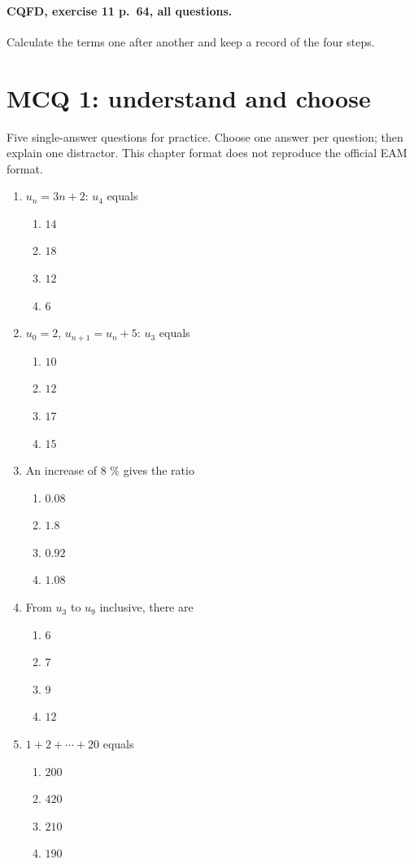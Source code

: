 \paragraph{CQFD, exercise 11 p.~64, all questions.}\label{C01-M2} Calculate the terms one after another and keep a record of the four steps.
\begingroup\small
\clearpage\section*{MCQ 1: understand and choose}\label{C01-Q1}
Five single-answer questions for practice. Choose one answer per question; then explain one distractor. This chapter format does not reproduce the official EAM format.
\begin{enumerate}
\item $u_n=3n+2$: $u_4$ equals
\begin{enumerate}[label=\Alph*.,itemsep=2pt]
\item $14$
\item $18$
\item $12$
\item $6$
\end{enumerate}
\item $u_0=2$, $u_{n+1}=u_n+5$: $u_3$ equals
\begin{enumerate}[label=\Alph*.,itemsep=2pt]
\item $10$
\item $12$
\item $17$
\item $15$
\end{enumerate}
\item An increase of 8 \% gives the ratio
\begin{enumerate}[label=\Alph*.,itemsep=2pt]
\item $0.08$
\item $1.8$
\item $0.92$
\item $1.08$
\end{enumerate}
\item From $u_3$ to $u_9$ inclusive, there are
\begin{enumerate}[label=\Alph*.,itemsep=2pt]
\item $6$
\item $7$
\item $9$
\item $12$
\end{enumerate}
\item $1+2+\cdots+20$ equals
\begin{enumerate}[label=\Alph*.,itemsep=2pt]
\item $200$
\item $420$
\item $210$
\item $190$
\end{enumerate}
\end{enumerate}
